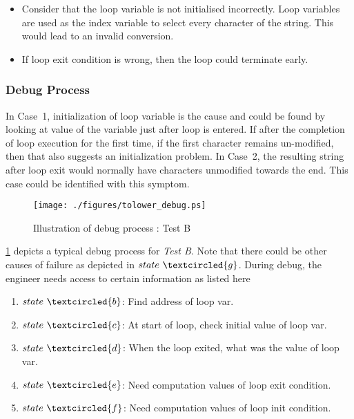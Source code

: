 \begin{itemize}

\item [Case 1:] Consider that the loop variable is not initialised incorrectly. Loop variables are used as the index variable to select every character of the string. This would lead to an invalid conversion. \label{algo:tolow:case1}

\item [Case 2:] If loop exit condition is wrong, then the loop could terminate early. \label{algo:tolow:case2}
\end{itemize}

\subsubsection{Debug Process}

In Case~1, initialization of loop variable is the cause and could be found by looking at value of the variable just after loop is entered. If after the completion of loop execution for the first time, if the first character remains un-modified, then that also suggests an initialization problem.
In Case~2, the resulting string after loop exit would normally have characters unmodified towards the end. This case could be identified with this symptom.

\begin{figure}[h]
\centering
\texttt{[image: ./figures/tolower\_debug.ps]}
\caption{Illustration of debug process : Test B} 
\label{fig:tolower_debug.ps}
\end{figure}

\figurename{\ref{fig:tolower_debug.ps}} depicts a typical debug process for {\it Test B}. Note that there could be other causes of failure as depicted in $state~\textcircled{g}$. During debug, the engineer needs access to certain information as listed here

\begin{enumerate}
\item $state~\textcircled{b}$: Find address of loop var.
\item $state~\textcircled{c}$: At start of loop, check initial value of loop var.
\item $state~\textcircled{d}$: When the loop exited, what was the value of loop var.
\item $state~\textcircled{e}$: Need computation values of loop exit condition.
\item $state~\textcircled{f}$: Need computation values of loop init condition.
\end{enumerate}

